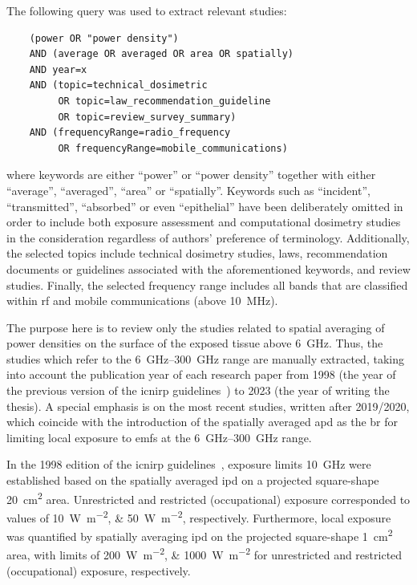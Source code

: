 The following query was used to extract relevant studies:
\begin{verbatim}
    (power OR "power density")
    AND (average OR averaged OR area OR spatially)
    AND year=x
    AND (topic=technical_dosimetric
         OR topic=law_recommendation_guideline
         OR topic=review_survey_summary)
    AND (frequencyRange=radio_frequency
         OR frequencyRange=mobile_communications)
\end{verbatim}
where keywords are either ``power'' or ``power density'' together with either ``average'', ``averaged'', ``area'' or ``spatially''.
Keywords such as ``incident'', ``transmitted'', ``absorbed'' or even ``epithelial'' have been deliberately omitted in order to include both exposure assessment and computational dosimetry studies in the consideration regardless of authors' preference of terminology.
Additionally, the selected topics include technical dosimetry studies, laws, recommendation documents or guidelines associated with the aforementioned keywords, and review studies.
Finally, the selected frequency range includes all bands that are classified within \gls{rf} and mobile communications (above \SI{10}{\MHz}).

The purpose here is to review only the studies related to spatial averaging of power densities on the surface of the exposed tissue above \SI{6}{\GHz}.
Thus, the studies which refer to the \SIrange{6}{300}{\GHz} range are manually extracted, taking into account the publication year of each research paper from 1998 (the year of the previous version of the \gls{icnirp} guidelines~\cite{ICNIRP1998Guidlines}) to 2023 (the year of writing the thesis).
A special emphasis is on the most recent studies, written after 2019/2020, which coincide with the introduction of the spatially averaged \gls{apd} as the \gls{br} for limiting local exposure to \gls{emf}s at the \SIrange{6}{300}{\GHz} range.

In the 1998 edition of the \gls{icnirp} guidelines~\cite{ICNIRP1998Guidlines}, exposure limits \SI{10}{\GHz} were established based on the spatially averaged \gls{ipd} on a projected square-shape \SI{20}{\cm\squared} area.
Unrestricted and restricted (occupational) exposure corresponded to values of \SIlist{10;50}{\watt\per\meter\squared}, respectively.
Furthermore, local exposure was quantified by spatially averaging \gls{ipd} on the projected square-shape \SI{1}{\cm\squared} area, with limits of \SIlist{200;1000}{\watt\per\meter\squared} for unrestricted and restricted (occupational) exposure, respectively.

